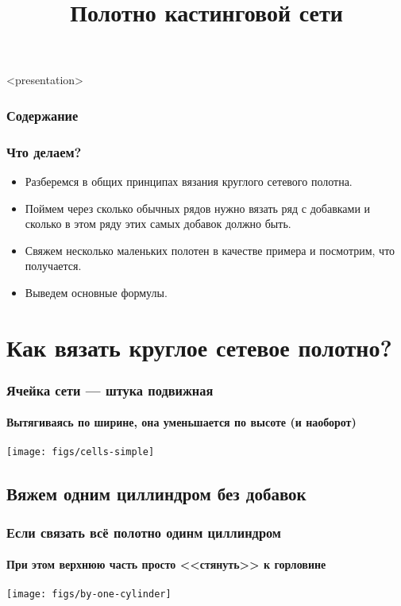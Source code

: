 

\title[Вяжем полотно кастинговой сети <<клиньями>>]{Полотно кастинговой сети}



\begin{frame}<presentation>
    \frametitle{Содержание}
    \tableofcontents
\end{frame}

\begin{frame}
    \frametitle{Что делаем?}

	\begin{itemize}
		\item Разберемся в общих принципах вязания круглого сетевого полотна.
		\item Поймем через сколько обычных рядов нужно вязать ряд с добавками и сколько в этом ряду этих самых добавок должно быть. 
		\item Свяжем несколько маленьких полотен в качестве примера и посмотрим, что получается.
		\item Выведем основные формулы.
	\end{itemize}
\end{frame}


\section{Как вязать круглое сетевое полотно?}

\begin{frame}
    \frametitle{Ячейка сети --- штука подвижная}
    \framesubtitle{Вытягиваясь по ширине, она уменьшается по высоте (и наоборот)}

    \begin{center}
        \texttt{[image: figs/cells-simple]}
    \end{center}
\end{frame}


\subsection{Вяжем одним циллиндром без добавок}

\begin{frame}
    \frametitle{Если связать всё полотно одинм циллиндром}
    \framesubtitle{При этом верхнюю часть просто <<стянуть>> к горловине}

    \begin{center}
        \texttt{[image: figs/by-one-cylinder]}
    \end{center}
\end{frame}

